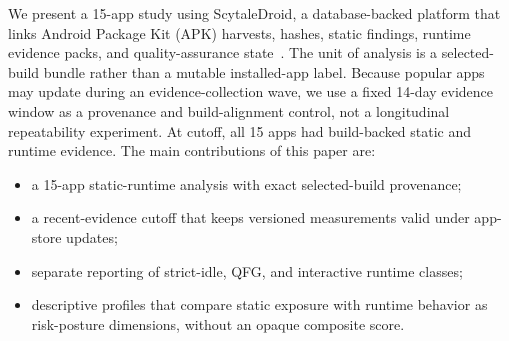 We present a 15-app study using ScytaleDroid, a database-backed platform that links Android Package Kit (APK) harvests, hashes, static findings, runtime evidence packs, and quality-assurance state~\cite{scytaledroid}. The unit of analysis is a selected-build bundle rather than a mutable installed-app label. Because popular apps may update during an evidence-collection wave, we use a fixed 14-day evidence window as a provenance and build-alignment control, not a longitudinal repeatability experiment. At cutoff, all 15 apps had build-backed static and runtime evidence. The main contributions of this paper are:
\begin{itemize}
    \item a 15-app static-runtime analysis with exact selected-build provenance;
    \item a recent-evidence cutoff that keeps versioned measurements valid under app-store updates;
    \item separate reporting of strict-idle, QFG, and interactive runtime classes;
    \item descriptive profiles that compare static exposure with runtime behavior as risk-posture dimensions, without an opaque composite score.
\end{itemize}
